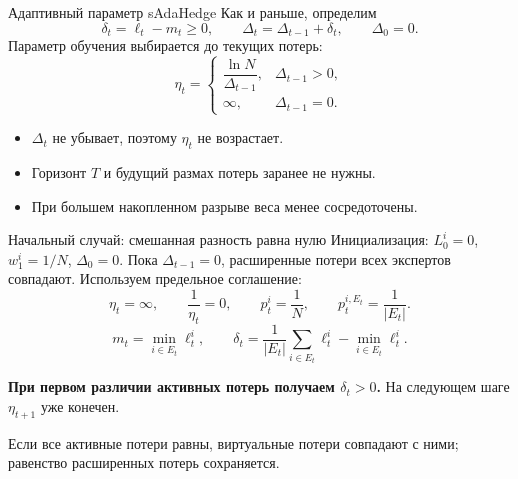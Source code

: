 \documentclass[11pt,aspectratio=169]{beamer}
\begin{document}
\begin{frame}{Адаптивный параметр sAdaHedge}
  Как и раньше, определим
  \[
    \delta_t=\ell_t-m_t\ge0,\qquad
    \Delta_t=\Delta_{t-1}+\delta_t,\qquad\Delta_0=0.
  \]
  Параметр обучения выбирается до текущих потерь:
  \[
    \eta_t=\begin{cases}
      \dfrac{\ln N}{\Delta_{t-1}},&\Delta_{t-1}>0,\\[2mm]
      \infty,&\Delta_{t-1}=0.
    \end{cases}
  \]
  \begin{itemize}
    \item $\Delta_t$ не убывает, поэтому $\eta_t$ не возрастает.
    \item Горизонт $T$ и будущий размах потерь заранее не нужны.
    \item При большем накопленном разрыве веса менее сосредоточены.
  \end{itemize}
\end{frame}

\begin{frame}{Начальный случай: смешанная разность равна нулю}
  Инициализация: $L_0^i=0$, $w_1^i=1/N$, $\Delta_0=0$.
  \medskip
  Пока $\Delta_{t-1}=0$, расширенные потери всех экспертов совпадают.
  Используем предельное соглашение:
  \[
    \eta_t=\infty,\qquad \frac1{\eta_t}=0,\qquad
    p_t^i=\frac1N,\qquad p_t^{i,E_t}=\frac1{|E_t|}.
  \]
  \[
    m_t=\min_{i\in E_t}\ell_t^i,\qquad
    \delta_t=\frac1{|E_t|}\sum_{i\in E_t}\ell_t^i-\min_{i\in E_t}\ell_t^i.
  \]
  \par\medskip\textbf{При первом различии активных потерь получаем $\delta_t>0$.}
  На следующем шаге $\eta_{t+1}$ уже конечен.
  \par\vfill{\scriptsize Если все активные потери равны, виртуальные потери совпадают с ними; равенство расширенных потерь сохраняется.\par}
\end{frame}
\end{document}
